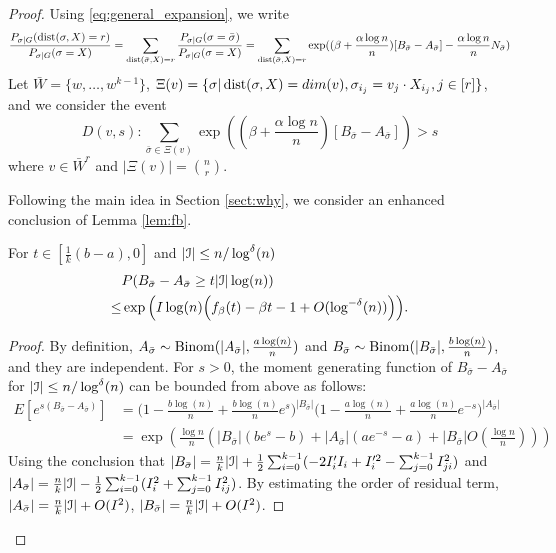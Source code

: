 \documentclass{article}
\begin{document}
\begin{proof}
Using \eqref{eq:general_expansion}, we write
$$
\frac{P_{\sigma|G}(\operatorname{dist}(\sigma, X)=r)}
{P_{\sigma|G}(\sigma=X)} = \sum_{\operatorname{dist}(\bar{\sigma}, X)=r} 
\frac{P_{\sigma|G}(\sigma=\bar{\sigma})}
{P_{\sigma|G}(\sigma=X)}=
\sum_{\operatorname{dist}(\bar{\sigma}, X)=r} \exp((\beta + \frac{\alpha \log n}{n})[B_{\bar{\sigma}} - A_{\bar{\sigma}}] - \frac{\alpha \log n}{n} N_{\bar{\sigma}})
$$
Let $\bar{W} = \{w, \dots, w^{k-1}\}$, $\Xi(v) = \{ \sigma | \operatorname{dist}(\sigma, X) = dim(v),  \sigma_{i_j} = v_j \cdot X_{i_j}, j \in [r] \}$, and we consider the event
$$
D(v, s): \sum_{\bar{\sigma} \in \Xi(v)} \exp((\beta + \frac{\alpha \log n}{n}) [B_{\bar{\sigma}} - A_{\bar{\sigma}}]) > s
$$
where $v \in \bar{W}^r$ and $|\Xi(v)|=\binom{n}{r}$.

Following the main idea in Section \ref{sect:why}, we consider an enhanced conclusion of Lemma \ref{lem:fb}.
\begin{lemma}\label{lem:enhanced_fb}
	For $t\in [\frac{1}{k}(b-a), 0]$
	and $ |\mathcal{I}| \le n/\log^{\delta}(n)$
	\begin{equation} \label{eq:upmpt}
	\begin{aligned}
	& P(B_{\bar{\sigma}}-A_{\bar{\sigma}}\ge t |\mathcal{I}| \log(n))  \\
	\le & \exp\Big(I\log(n)
	\Big(f_{\beta}(t) - \beta t -1	+ O(\log^{-\delta}(n)) \Big)\Big) .
	\end{aligned}
	\end{equation}
\end{lemma}
\begin{proof}
	By definition, $A_{\bar{\sigma}}\sim\operatorname{Binom}(|A_{\bar{\sigma}}|,\frac{a\log(n)}{n})$ and
	$B_{\bar{\sigma}}\sim\operatorname{Binom}(|B_{\bar{\sigma}}|,\frac{b\log(n)}{n})$, and they are independent. For $s>0$, the moment generating function of $B_{\bar{\sigma}}-A_{\bar{\sigma}}$ for $ |\mathcal{I}| \le n/\log^{\delta}(n)$ can be bounded from above as follows:
	\begin{align*}
	 E[e^{s(B_{\bar{\sigma}}-A_{\bar{\sigma}})}] 
	& =\Big(1-\frac{b\log(n)}{n}+\frac{b\log(n)}{n} e^s \Big)^{|B_{\bar{\sigma}}|}
	\Big(1-\frac{a\log(n)}{n}+\frac{a\log(n)}{n} e^{-s} \Big)^{|A_{\bar{\sigma}}|}  \\
	& = \exp(\frac{\log n}{n}(|B_{\bar{\sigma}}|(be^s - b) + |A_{\bar{\sigma}}|(ae^{-s}-a) + |B_{\bar{\sigma}}|O(\frac{\log n}{n}) ))
	\end{align*}
	Using the conclusion that $|B_{\bar{\sigma}}|=\frac{n}{k}|\mathcal{I}| + \frac{1}{2}\sum_{i=0}^{k-1}  (-2 I'_i I_i  + I'^2_i - \sum_{j=0}^{k-1} I^2_{ji})$ and
	$|A_{\bar{\sigma}}| = \frac{n}{k}|\mathcal{I}| - \frac{1}{2}\sum_{i=0}^{k-1}  (I^2_i + \sum_{j=0}^{k-1} I^2_{ij})$.
	By estimating the order of residual term, $|A_{\bar{\sigma}}| = \frac{n}{k}|\mathcal{I}| + O(I^2)$,
	 $|B_{\bar{\sigma}}| = \frac{n}{k}|\mathcal{I}| + O(I^2)$.
	 

\end{proof}
\end{proof}
\end{document}
